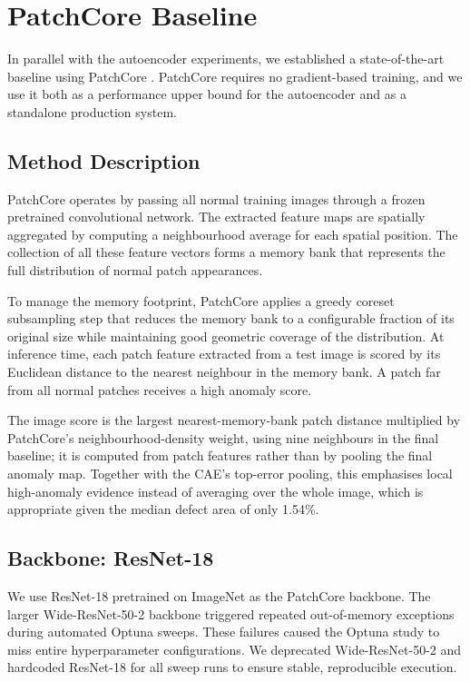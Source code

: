 \documentclass[11pt, a4paper]{article}
\begin{document}
\section{PatchCore Baseline}
\label{sec:patchcore}

In parallel with the autoencoder experiments, we established a state-of-the-art baseline using PatchCore \cite{roth2022patchcore}. PatchCore requires no gradient-based training, and we use it both as a performance upper bound for the autoencoder and as a standalone production system.

\subsection{Method Description}

PatchCore operates by passing all normal training images through a frozen pretrained convolutional network. The extracted feature maps are spatially aggregated by computing a neighbourhood average for each spatial position. The collection of all these feature vectors forms a memory bank that represents the full distribution of normal patch appearances.

To manage the memory footprint, PatchCore applies a greedy coreset subsampling step that reduces the memory bank to a configurable fraction of its original size while maintaining good geometric coverage of the distribution. At inference time, each patch feature extracted from a test image is scored by its Euclidean distance to the nearest neighbour in the memory bank. A patch far from all normal patches receives a high anomaly score.

The image score is the largest nearest-memory-bank patch distance multiplied by PatchCore's neighbourhood-density weight, using nine neighbours in the final baseline; it is computed from patch features rather than by pooling the final anomaly map. Together with the CAE's top-error pooling, this emphasises local high-anomaly evidence instead of averaging over the whole image, which is appropriate given the median defect area of only 1.54\%.

\subsection{Backbone: ResNet-18}
\label{sec:backbone}

We use ResNet-18 pretrained on ImageNet as the PatchCore backbone. The larger Wide-ResNet-50-2 backbone triggered repeated out-of-memory exceptions during automated Optuna sweeps. These failures caused the Optuna study to miss entire hyperparameter configurations. We deprecated Wide-ResNet-50-2 and hardcoded ResNet-18 for all sweep runs to ensure stable, reproducible execution.
\end{document}
